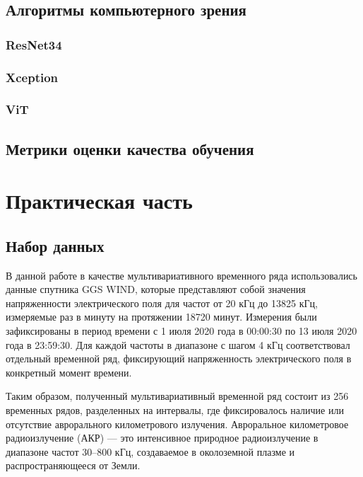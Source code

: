 \documentclass[spec, och, diploma]{SCWorks}
\begin{document}
    \subsection{Алгоритмы компьютерного зрения}

        \subsubsection{ResNet34}

        \subsubsection{Xception}
        
        \subsubsection{ViT}

    \subsection{Метрики оценки качества обучения}

\section{Практическая часть}

    \subsection{Набор данных}

        В данной работе в качестве мультивариативного временного ряда
        использовались данные спутника GGS WIND, которые представляют собой
        значения напряженности электрического поля для частот от 20 кГц до 13825
        кГц, измеряемые раз в минуту на протяжении 18720 минут. Измерения были
        зафиксированы в период времени с 1 июля 2020 года в 00:00:30 по 13 июля
        2020 года в 23:59:30. Для каждой частоты в диапазоне с шагом 4 кГц
        соответствовал отдельный временной ряд, фиксирующий напряженность
        электрического поля в конкретный момент времени.
        
        Таким образом, полученный мультивариативный временной ряд состоит из 256
        временных рядов, разделенных на интервалы, где фиксировалось наличие или
        отсутствие аврорального километрового излучения. Авроральное
        километровое радиоизлучение (АКР) — это интенсивное природное
        радиоизлучение в диапазоне частот 30–800 кГц, создаваемое в околоземной
        плазме и распространяющееся от Земли.
\end{document}
